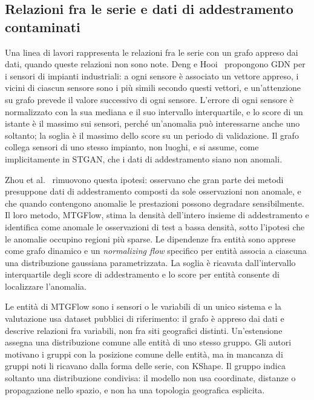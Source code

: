 \subsection{Relazioni fra le serie e dati di addestramento contaminati}

Una linea di lavori rappresenta le relazioni fra le serie con un grafo appreso dai dati, quando queste relazioni non sono note. Deng e Hooi~\cite{deng2021gdn} propongono GDN per i sensori di impianti industriali: a ogni sensore è associato un vettore appreso, i vicini di ciascun sensore sono i più simili secondo questi vettori, e un'attenzione su grafo prevede il valore successivo di ogni sensore. L'errore di ogni sensore è normalizzato con la sua mediana e il suo intervallo interquartile, e lo score di un istante è il massimo sui sensori, perché un'anomalia può interessarne anche uno soltanto; la soglia è il massimo dello score su un periodo di validazione. Il grafo collega sensori di uno stesso impianto, non luoghi, e si assume, come implicitamente in STGAN, che i dati di addestramento siano non anomali.

Zhou et al.~\cite{zhou2023labelfree} rimuovono questa ipotesi: osservano che gran parte dei metodi presuppone dati di addestramento composti da sole osservazioni non anomale, e che quando contengono anomalie le prestazioni possono degradare sensibilmente. Il loro metodo, MTGFlow, stima la densità dell'intero insieme di addestramento e identifica come anomale le osservazioni di test a bassa densità, sotto l'ipotesi che le anomalie occupino regioni più sparse. Le dipendenze fra entità sono apprese come grafo dinamico e un \emph{normalizing flow} specifico per entità associa a ciascuna una distribuzione gaussiana parametrizzata. La soglia è ricavata dall'intervallo interquartile degli score di addestramento e lo score per entità consente di localizzare l'anomalia.

Le entità di MTGFlow sono i sensori o le variabili di un unico sistema e la valutazione usa dataset pubblici di riferimento: il grafo è appreso dai dati e descrive relazioni fra variabili, non fra siti geografici distinti. Un'estensione assegna una distribuzione comune alle entità di uno stesso gruppo. Gli autori motivano i gruppi con la posizione comune delle entità, ma in mancanza di gruppi noti li ricavano dalla forma delle serie, con KShape. Il gruppo indica soltanto una distribuzione condivisa: il modello non usa coordinate, distanze o propagazione nello spazio, e non ha una topologia geografica esplicita.

